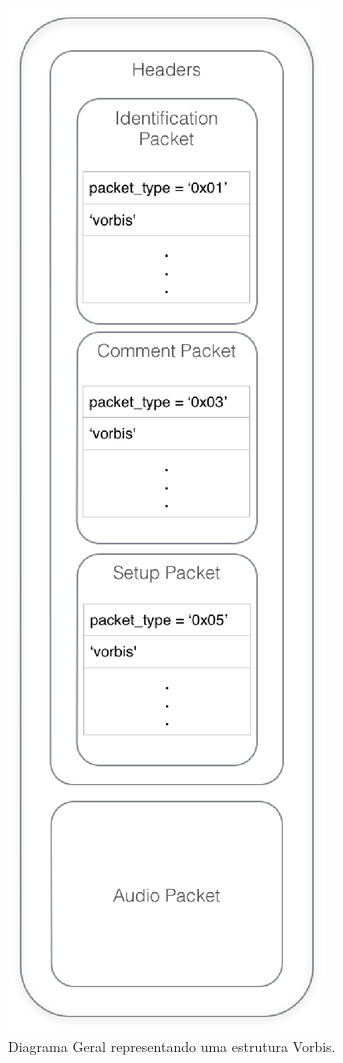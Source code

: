 \begin{figure}[ht]
	\centering
		\includegraphics[keepaspectratio=true,scale=0.6]{figuras/vorbisstructure.eps}
	\caption{Diagrama Geral representando uma estrutura Vorbis.}
	\label{vorbisstructure}
\end{figure}

